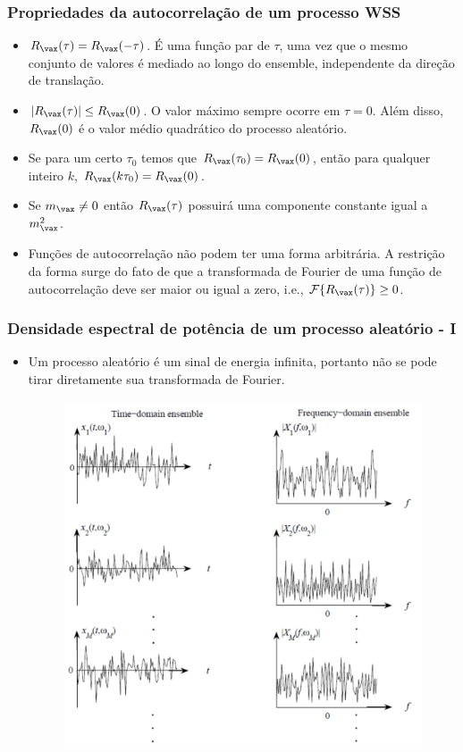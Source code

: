 \begin{frame}
    \frametitle{Propriedades da autocorrelação de um processo WSS}

    \begin{itemize}
     \item $R_{\vax}(\tau) = R_{\vax}(-\tau)$. É uma função par de $\tau$, uma vez que o mesmo conjunto de valores é mediado ao longo do ensemble, independente da direção de translação.
      \item $|R_{\vax}(\tau)| \leq R_{\vax}(0)$. O valor máximo sempre ocorre em $\tau = 0$. Além disso, $R_{\vax}(0)$ é o valor médio quadrático do processo aleatório.
      \item Se para um certo $\tau_0$ temos que $R_{\vax}(\tau_0) = R_{\vax}(0)$, então para qualquer inteiro $k$, $R_{\vax}(k\tau_0) = R_{\vax}(0)$.
      \item Se $m_{\vax} \neq 0$ então $R_{\vax}(\tau)$ possuirá uma componente constante igual a $m_{\vax}^2$.
      \item Funções de autocorrelação não podem ter uma forma arbitrária. A restrição da forma surge do fato de que a transformada de Fourier de uma função de autocorrelação deve ser maior ou igual a zero, i.e., $\mathcal{F}\{R_{\vax}(\tau)\} \geq 0$.
    \end{itemize}
     
\end{frame}

\begin{frame}
    \frametitle{Densidade espectral de potência de um processo aleatório - I}

    \begin{itemize}
     \item Um processo aleatório é um sinal de energia infinita, portanto não se pode tirar diretamente sua transformada de Fourier.
      \begin{figure}[t]
	  \begin{center}
	    \includegraphics[width=0.55\columnwidth]{figs/fig25}
	  \end{center}
	\end{figure}
    \end{itemize}
     
\end{frame}

